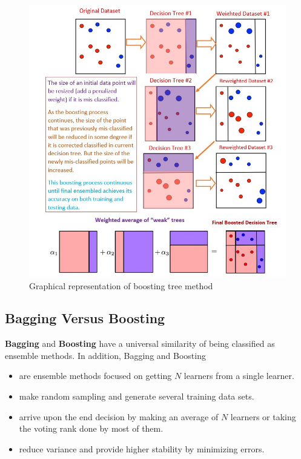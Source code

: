 \documentclass[
]{book}
\begin{document}
\begin{figure}

{\centering \includegraphics[width=0.8\linewidth]{img09/w09-DemoBoostedTreeAlgorithm} 

}

\caption{Graphical representation of boosting tree method}\label{fig:unnamed-chunk-233}
\end{figure}

\hypertarget{bagging-versus-boosting}{%
\subsection{Bagging Versus Boosting}\label{bagging-versus-boosting}}

\textbf{Bagging} and \textbf{Boosting} have a universal similarity of being classified as ensemble methods. In addition, Bagging and Boosting

\begin{itemize}
\item
  are ensemble methods focused on getting \(N\) learners from a single learner.
\item
  make random sampling and generate several training data sets.
\item
  arrive upon the end decision by making an average of \(N\) learners or taking the voting rank done by most of them.
\item
  reduce variance and provide higher stability by minimizing errors.
\end{itemize}
\end{document}
